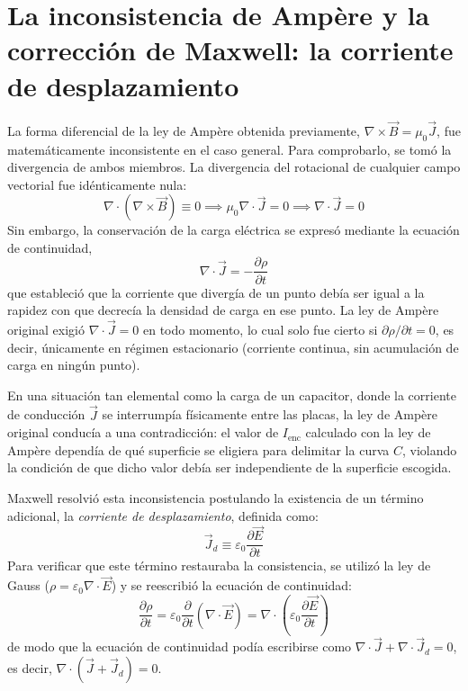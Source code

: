 \section{La inconsistencia de Ampère y la corrección de Maxwell: la corriente de desplazamiento}
La forma diferencial de la ley de Ampère obtenida previamente, $\nabla \times \vec{B} = \mu_0 \vec{J}$, fue matemáticamente inconsistente en el caso general. Para comprobarlo, se tomó la divergencia de ambos miembros. La divergencia del rotacional de cualquier campo vectorial fue idénticamente nula:
\begin{equation}
    \nabla \cdot (\nabla \times \vec{B}) \equiv 0 \implies \mu_0 \nabla \cdot \vec{J} = 0 \implies \nabla \cdot \vec{J} = 0
\end{equation}
Sin embargo, la conservación de la carga eléctrica se expresó mediante la ecuación de continuidad,
\begin{equation}
    \nabla \cdot \vec{J} = -\frac{\partial \rho}{\partial t}
\end{equation}
que estableció que la corriente que divergía de un punto debía ser igual a la rapidez con que decrecía la densidad de carga en ese punto. La ley de Ampère original exigió $\nabla \cdot \vec{J} = 0$ en todo momento, lo cual solo fue cierto si $\partial \rho / \partial t = 0$, es decir, únicamente en régimen estacionario (corriente continua, sin acumulación de carga en ningún punto). 

En una situación tan elemental como la carga de un capacitor, donde la corriente de conducción $\vec{J}$ se interrumpía físicamente entre las placas, la ley de Ampère original conducía a una contradicción: el valor de $I_{\text{enc}}$ calculado con la ley de Ampère dependía de qué superficie se eligiera para delimitar la curva $C$, violando la condición de que dicho valor debía ser independiente de la superficie escogida.

Maxwell resolvió esta inconsistencia postulando la existencia de un término adicional, la \textit{corriente de desplazamiento}, definida como:
\begin{equation}
    \vec{J}_d \equiv \varepsilon_0 \frac{\partial \vec{E}}{\partial t}
\end{equation}
Para verificar que este término restauraba la consistencia, se utilizó la ley de Gauss ($\rho = \varepsilon_0 \nabla \cdot \vec{E}$) y se reescribió la ecuación de continuidad:
\begin{equation}
    \frac{\partial \rho}{\partial t} = \varepsilon_0 \frac{\partial}{\partial t} (\nabla \cdot \vec{E}) = \nabla \cdot \left( \varepsilon_0 \frac{\partial \vec{E}}{\partial t} \right)
\end{equation}
de modo que la ecuación de continuidad podía escribirse como $\nabla \cdot \vec{J} + \nabla \cdot \vec{J}_d = 0$, es decir, $\nabla \cdot (\vec{J} + \vec{J}_d) = 0$.

